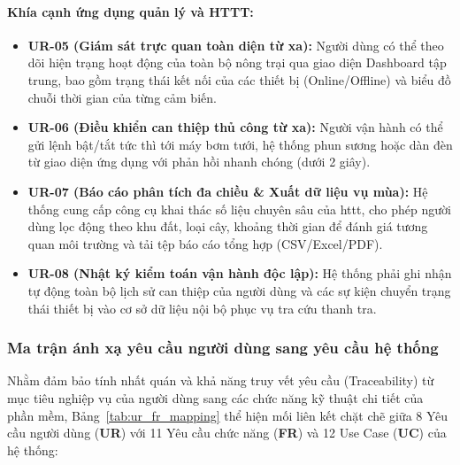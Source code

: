 \paragraph{Khía cạnh ứng dụng quản lý và HTTT:}
\begin{itemize}
    \item \textbf{UR-05 (Giám sát trực quan toàn diện từ xa):} Người dùng có thể theo dõi hiện trạng hoạt động của toàn bộ nông trại qua giao diện Dashboard tập trung, bao gồm trạng thái kết nối của các thiết bị (Online/Offline) và biểu đồ chuỗi thời gian của từng cảm biến.
    \item \textbf{UR-06 (Điều khiển can thiệp thủ công từ xa):} Người vận hành có thể gửi lệnh bật/tắt tức thì tới máy bơm tưới, hệ thống phun sương hoặc dàn đèn từ giao diện ứng dụng với phản hồi nhanh chóng (dưới 2 giây).
    \item \textbf{UR-07 (Báo cáo phân tích đa chiều \& Xuất dữ liệu vụ mùa):} Hệ thống cung cấp công cụ khai thác số liệu chuyên sâu của \gls{httt}, cho phép người dùng lọc động theo khu đất, loại cây, khoảng thời gian để đánh giá tương quan môi trường và tải tệp báo cáo tổng hợp (CSV/Excel/PDF).
    \item \textbf{UR-08 (Nhật ký kiểm toán vận hành độc lập):} Hệ thống phải ghi nhận tự động toàn bộ lịch sử can thiệp của người dùng và các sự kiện chuyển trạng thái thiết bị vào cơ sở dữ liệu nội bộ phục vụ tra cứu thanh tra.
\end{itemize}

\subsubsection{Ma trận ánh xạ yêu cầu người dùng sang yêu cầu hệ thống}

Nhằm đảm bảo tính nhất quán và khả năng truy vết yêu cầu (Traceability) từ mục tiêu nghiệp vụ của người dùng sang các chức năng kỹ thuật chi tiết của phần mềm, Bảng~\ref{tab:ur_fr_mapping} thể hiện mối liên kết chặt chẽ giữa 8 Yêu cầu người dùng (\textbf{UR}) với 11 Yêu cầu chức năng (\textbf{FR}) và 12 Use Case (\textbf{UC}) của hệ thống:

